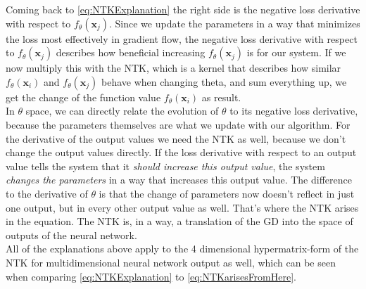 Coming back to \cref{eq:NTKExplanation} the right side is the negative loss derivative with respect to $f_\theta(\mathbf{x}_j)$. Since we update the parameters in a way that minimizes the loss most effectively in gradient flow, the negative loss derivative with respect to $f_\theta(\mathbf{x}_j)$ describes how beneficial increasing $f_\theta(\mathbf{x}_j)$ is for our system. If we now multiply this with the NTK, which is a kernel that describes how similar $f_\theta(\mathbf{x}_i)$ and $f_\theta(\mathbf{x}_j)$ behave when changing theta, and sum everything up, we get the change of the function value $f_\theta(\mathbf{x}_i)$ as result.\\
In $\theta$ space, we can directly relate the evolution of $\theta$ to its negative loss derivative, because the parameters themselves are what we update with our algorithm. For the derivative of the output values we need the NTK as well, because we don't change the output values directly. If the loss derivative with respect to an output value tells the system that it \textit{should increase this output value}, the system \textit{changes the parameters} in a way that increases this output value. The difference to the derivative of $\theta$ is that the change of parameters now doesn't reflect in just one output, but in every other output value as well. That's where the NTK arises in the equation. The NTK is, in a way, a translation of the GD into the space of outputs of the neural network.\\
All of the explanations above apply to the 4 dimensional hypermatrix-form of the NTK for multidimensional neural network output as well, which can be seen when comparing \cref{eq:NTKExplanation} to \cref{eq:NTKarisesFromHere}.